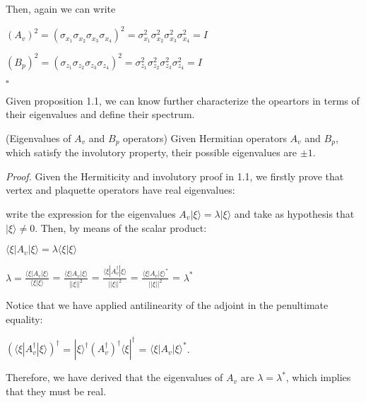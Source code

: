 \documentclass{Configuration_Files/PoliMi3i_thesis}
\begin{document}
Then, again we can write \newline

\begin{center}
	$(A_v)^{2} = (\sigma_{x_1} \sigma_{x_2} \sigma_{x_3} \sigma_{x_4})^{2} = \sigma_{x_1}^2 \sigma_{x_2}^2 \sigma_{x_3}^2 \sigma_{x_4}^2 = I$ 
	
	$(B_p)^{2} = (\sigma_{z_1} \sigma_{z_2} \sigma_{z_3} \sigma_{z_4})^{2} = \sigma_{z_1}^2 \sigma_{z_2}^2 \sigma_{z_3}^2 \sigma_{z_4}^2 = I$
\end{center}

\hfill $\square$

Given proposition 1.1, we can know further characterize the opeartors in terms of their eigenvalues and define their spectrum.

\begin{proposition} (Eigenvalues of $A_v$ and $B_p$ operators) Given Hermitian operators $A_v$ and $B_p$, which satisfy the involutory property, their possible eigenvalues are $\pm 1$.
\end{proposition}


\textit{Proof.}\newline
Given the Hermiticity and involutory proof in 1.1, we firstly prove that vertex and plaquette operators have real eigenvalues: 

write the expression for the eigenvalues $A_v |\xi \rangle = \lambda |\xi \rangle$ and take as hypothesis that $|\xi \rangle \neq 0$. Then, by means of the scalar product:

\begin{center}
	$\langle \xi|A_v|\xi \rangle = \lambda \langle \xi | \xi \rangle$
	
	$\lambda = \frac {\langle \xi|A_v|\xi \rangle}{\langle \xi |\xi \rangle}$ = $\frac {\langle \xi|A_v|\xi \rangle}{||\xi||^2}$ = $\frac {\langle \xi|A_v^{\dagger}|\xi \rangle}{||\xi||^2}$ = $\frac {\langle \xi|A_v|\xi\rangle^*}{||\xi||^2}$ = $\lambda^*$ 
\end{center}

Notice that we have applied antilinearity of the adjoint in the penultimate equality: 

\begin{center}
	$(\langle \xi|A_v^{\dagger}|\xi \rangle)^{\dagger}$ = $|\xi\rangle^{\dagger} (A_v^{\dagger})^{\dagger} \langle\xi|^{\dagger}$ = $\langle \xi|A_v|\xi \rangle^*$.  
\end{center}

Therefore, we have derived that the eigenvalues of $A_v$ are $\lambda = \lambda^*$, which implies that they must be real.
\end{document}
